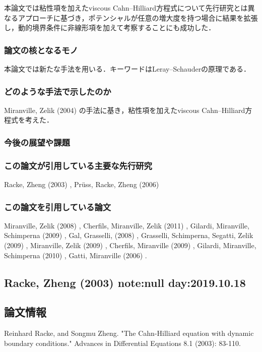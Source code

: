 \documentclass[openary, a4paper, oneside]{jsarticle}
\begin{document}
		本論文では粘性項を加えたviscous Cahn--Hilliard方程式について先行研究とは異なるアプローチに基づき，ポテンシャルが任意の増大度を持つ場合に結果を拡張し，動的境界条件に非線形項を加えて考察することにも成功した．
	\subsubsection{論文の核となるモノ}
		本論文では新たな手法を用いる．キーワードはLeray--Schauderの原理である．
	\subsubsection{どのような手法で示したのか}
		Miranville, Zelik (2004) \cite{MiranvilleZelik2004} の手法に基き，粘性項を加えたviscous Cahn--Hilliard方程式を考えた．
	\subsubsection{今後の展望や課題}
	\subsubsection{この論文が引用している主要な先行研究}
		Racke, Zheng (2003) \cite{RackeZheng2003}, Pr\"uss, Racke, Zheng (2006) \cite{PrussRackeZheng2006} 
	\subsubsection{この論文を引用している論文}
		Miranville, Zelik (2008) \cite{MiranvilleZelik2008},
		Cherfils, Miranville, Zelik (2011) \cite{CherfilsMiranvilleZelik2011},
		Gilardi, Miranville, Schimperna (2009) \cite{GilardiMiranvilleSchimperna2009},
		Gal, Grasselli, (2008) \cite{GalGrasselli2008},
		Grasselli, Schimperna, Segatti, Zelik (2009) \cite{GrasselliSchimpernaSegattiZelik2009},
		Miranville, Zelik (2009) \cite{MiranvilleZelik2009},
		Cherfils, Miranville (2009) \cite{CherfilsMiranville2009},
		Gilardi, Miranville, Schimperna (2010) \cite{GilardiMiranvilleSchimperna2010},
		Gatti, Miranville (2006) \cite{GattiMiranville2006}.

\newpage

\subsection{Racke, Zheng (2003) \cite{RackeZheng2003} note:null day:2019.10.18}
	\subsection{論文情報}
		Reinhard Racke, and Songmu Zheng. "The Cahn-Hilliard equation with dynamic boundary conditions." Advances in Differential Equations 8.1 (2003): 83-110.
\end{document}
